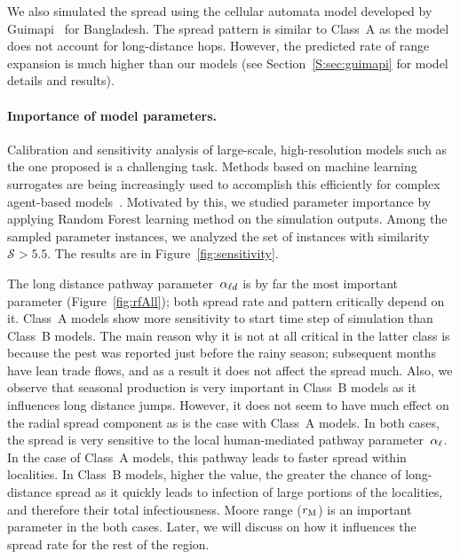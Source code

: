 \documentclass[11pt]{article}
\newcommand{\similarity}{\mathcal{S}}
\theoremstyle{definition}
\begin{document}
We also simulated the spread using the cellular automata model developed by
Guimapi~\cite{guimapi2016modeling} for Bangladesh. The spread pattern is
similar to Class~A as the model does not account for long-distance
hops. However, the predicted rate of range expansion is much higher than
our models (see Section~\ref{S:sec:guimapi} for model details and results).


\paragraph{Importance of model parameters.} 
Calibration and sensitivity analysis of large-scale, high-resolution models such as
the one proposed is a challenging task. Methods based on machine learning
surrogates are being increasingly used to accomplish this efficiently for
complex agent-based models~\cite{lamperti2018agent}. Motivated by this, we
studied parameter importance by applying Random Forest learning method on
the simulation outputs. Among the sampled parameter instances, we analyzed
the set of instances with similarity~$\similarity>5.5$. The results are in
Figure~\ref{fig:sensitivity}. 

The long distance pathway parameter~$\alpha_{\ell d}$ is by far the most important
parameter (Figure~\ref{fig:rfAll}); both spread rate and pattern critically
depend on it. Class~A models show more sensitivity to start time step of
simulation than Class~B models. The main reason why it is not at all
critical in the latter class is because the pest was reported just before
the rainy season; subsequent months have lean trade flows, and as a result
it does not affect the spread much. Also, we observe that seasonal
production is very important in Class~B models as it influences long
distance jumps. However, it does not seem to have much effect on the radial
spread component as is the case with Class~A models. In both cases, the
spread is very sensitive to the local human-mediated pathway
parameter~$\alpha_{\ell}$. In the case of Class~A models, this pathway leads to
faster spread within localities. In Class~B models, higher the value, the
greater the chance of long-distance spread as it quickly leads to infection
of large portions of the localities, and therefore their total
infectiousness. Moore range ($r_\mathrm{M}$) is an important parameter in
the both cases. Later, we will discuss on how it influences the spread rate
for the rest of the region.
\end{document}
